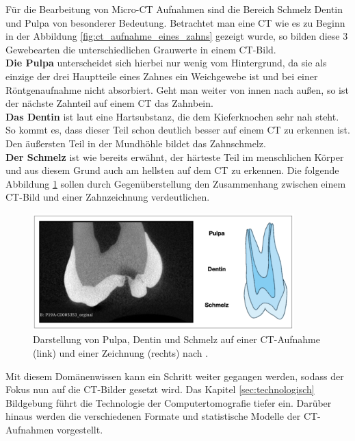 Für die Bearbeitung von Micro-CT Aufnahmen sind die Bereich Schmelz Dentin und Pulpa
von besonderer Bedeutung. Betrachtet man eine CT wie es zu Beginn in der
Abbildung \ref{fig:ct_aufnahme_eines_zahns} gezeigt wurde, so bilden diese 3 Gewebearten
die unterschiedlichen Grauwerte in einem CT-Bild. \\ \textbf{Die Pulpa} unterscheidet
sich hierbei nur wenig vom Hintergrund, da sie als einzige der drei Hauptteile
eines Zahnes ein Weichgewebe ist und bei einer Röntgenaufnahme nicht absorbiert.
Geht man weiter von innen nach außen, so ist der nächste Zahnteil auf einem CT
das Zahnbein. \\ \textbf{Das Dentin} ist laut \citet[Seite 41]{lehmann2012Zahnheilkunde}
eine Hartsubstanz, die dem Kieferknochen sehr nah steht. So kommt es, dass dieser
Teil schon deutlich besser auf einem CT zu erkennen ist. Den äußersten Teil in
der Mundhöhle bildet das Zahnschmelz. \\ \textbf{Der Schmelz} ist wie
bereits erwähnt, der härteste Teil im menschlichen Körper und aus diesem Grund auch
am hellsten auf dem CT zu erkennen. Die folgende Abbildung
\ref{fig:pulpa_dentin_schmelz} sollen durch Gegenüberstellung den Zusammenhang
zwischen einem CT-Bild und einer Zahnzeichnung verdeutlichen.

\begin{figure}[h]
	\centering
	\includegraphics[width=0.9\textwidth]{
		img/Bildschirmfoto 2024-11-22 um 15.13.24.jpg
	}
	\caption{Darstellung von Pulpa, Dentin und Schmelz auf einer CT-Aufnahme (link)
	und einer Zeichnung (rechts) nach \citet[Seite 29]{lehmann2012Zahnheilkunde}. }
	\label{fig:pulpa_dentin_schmelz}
\end{figure}

Mit diesem Domänenwissen kann ein Schritt weiter gegangen werden, sodass der
Fokus nun auf die CT-Bilder gesetzt wird. Das Kapitel \ref{sec:technologisch} Bildgebung
führt die Technologie der Computertomografie tiefer ein. Darüber hinaus werden die
verschiedenen Formate und statistische Modelle der CT-Aufnahmen vorgestellt.

